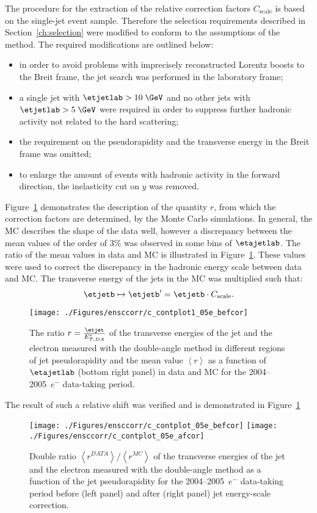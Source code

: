 The procedure for the extraction of the relative correction factors $C_\text{scale}$ is based on the single-jet event sample. Therefore the selection requirements described in Section~\ref{ch:selection} were modified to conform to the assumptions of the method. The required modifications are outlined below: 
\begin{itemize}
	\item in order to avoid problems with imprecisely reconstructed Lorentz boosts to the Breit frame, the jet search was performed in the laboratory frame;
	\item a single jet with $\etjetlab > 10\; \GeV$ and no other jets with $\etjetlab > 5\; \GeV$ were required in order to suppress further hadronic activity not related to the hard scattering;
	\item the requirement on the pseudorapidity and the transverse energy in the Breit frame was omitted;
	\item to enlarge the amount of events with hadronic activity in the forward direction, the inelasticity cut on $y$ was removed.
\end{itemize}

Figure~\ref{fig:ratcalibcontrolplot} demonstrates the description of the quantity $r$, from which the correction factors are determined, by the Monte Carlo simulations. In general, the MC describes the shape of the data well, however a discrepancy between the mean values of the order of 3\% was observed in some bins of $\etajetlab$. The ratio of the mean values in data and MC is illustrated in Figure~\ref*{fig:ratcalibcontrolplot}. These values were used to correct the discrepancy in the hadronic energy scale between data and MC. The transverse energy of the jets in the MC was multiplied such that:
\begin{equation}
 \etjetb \mapsto \etjetb' = \etjetb \cdot C_\text{scale}.
\end{equation}
\begin{figure}[htbp]
	\centering
		\texttt{[image: ./Figures/ensccorr/c\_contplot1\_05e\_befcor]} 
	\caption{The ratio $r=\frac{\etjet}{E_{T,DA}^e}$ of the transverse energies of the jet and the electron measured with the double-angle method in different regions of jet pseudorapidity \etajetlab and the mean value $\left\langle r\right\rangle$ as a function of $\etajetlab$ (bottom right panel) in data and MC for the 2004--2005~$e^-$ data-taking period.}
	\label{fig:ratcalibcontrolplot}
\end{figure}
The result of such a relative shift was verified and is demonstrated in Figure~\ref*{fig:ratcalibcontrolplot}
\begin{figure}[htbp]
	\centering
		\texttt{[image: ./Figures/ensccorr/c\_contplot\_05e\_befcor]} 
		\texttt{[image: ./Figures/ensccorr/c\_contplot\_05e\_afcor]} 
	\caption{Double ratio $\left\langle r^{DATA}\right\rangle/\left\langle r^{MC}\right\rangle$ of the transverse energies of the jet and the electron measured with the double-angle method as a function of the jet pseudorapidity for the 2004--2005~$e^-$ data-taking period before (left panel) and after (right panel) jet energy-scale correction.}
	\label{fig:doubleratcalib}
\end{figure}

